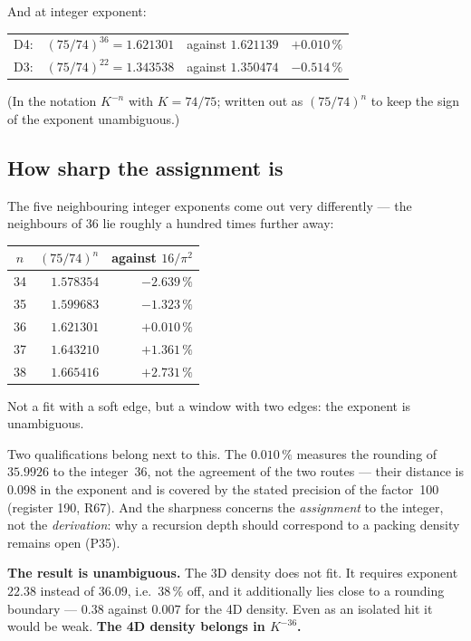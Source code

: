 And at integer exponent:
\begin{center}
\begin{tabular}{lllr}
D4: & $(75/74)^{36} = 1.621301$ & against $1.621139$ & $+0.010\,\%$ \\
D3: & $(75/74)^{22} = 1.343538$ & against $1.350474$ & $-0.514\,\%$ \\
\end{tabular}
\end{center}
(In the notation $K^{-n}$ with $K = 74/75$; written out as $(75/74)^n$
to keep the sign of the exponent unambiguous.)

\subsection*{How sharp the assignment is}

The five neighbouring integer exponents come out very differently ---
the neighbours of 36 lie roughly a hundred times further away:
\begin{center}
\begin{tabular}{crr}
\toprule
$n$ & $(75/74)^n$ & against $16/\pi^2$ \\
\midrule
34 & $1.578354$ & $-2.639\,\%$ \\
35 & $1.599683$ & $-1.323\,\%$ \\
36 & $1.621301$ & $\mathbf{+0.010\,\%}$ \\
37 & $1.643210$ & $+1.361\,\%$ \\
38 & $1.665416$ & $+2.731\,\%$ \\
\bottomrule
\end{tabular}
\end{center}
Not a fit with a soft edge, but a window with two edges: the exponent
is unambiguous.

Two qualifications belong next to this. The $0.010\,\%$ measures the
rounding of $35.9926$ to the integer~36, not the agreement of the two
routes --- their distance is $0.098$ in the exponent and is covered by
the stated precision of the factor~100 (register 190, R67). And the
sharpness concerns the \emph{assignment} to the integer, not the
\emph{derivation}: why a recursion depth should correspond to a
packing density remains open (P35).

\textbf{The result is unambiguous.} The 3D density does not fit. It
requires exponent $22.38$ instead of $36.09$, i.e.\ $38\,\%$ off, and
it additionally lies close to a rounding boundary --- $0.38$ against
$0.007$ for the 4D density. Even as an isolated hit it would be weak.
\textbf{The 4D density belongs in $K^{-36}$.}

